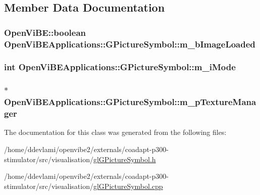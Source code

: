 \subsection{Member Data Documentation}
\hypertarget{classOpenViBEApplications_1_1GPictureSymbol_a2d1c4763b217b7b21de1a69ca0a2da35}{
\subsubsection[{m\_\-bImageLoaded}]{\setlength{\rightskip}{0pt plus 5cm}OpenViBE::boolean {\bf OpenViBEApplications::GPictureSymbol::m\_\-bImageLoaded}}}
\label{classOpenViBEApplications_1_1GPictureSymbol_a2d1c4763b217b7b21de1a69ca0a2da35}
\hypertarget{classOpenViBEApplications_1_1GPictureSymbol_a8a893eb95cd346f30b66bdd7379a80d4}{
\subsubsection[{m\_\-iMode}]{\setlength{\rightskip}{0pt plus 5cm}int {\bf OpenViBEApplications::GPictureSymbol::m\_\-iMode}}}
\label{classOpenViBEApplications_1_1GPictureSymbol_a8a893eb95cd346f30b66bdd7379a80d4}
\hypertarget{classOpenViBEApplications_1_1GPictureSymbol_a31525f4e7bbde19d7e455944184d12d0}{
\subsubsection[{m\_\-pTextureManager}]{$\ast$ {\bf OpenViBEApplications::GPictureSymbol::m\_\-pTextureManager}}}
\label{classOpenViBEApplications_1_1GPictureSymbol_a31525f4e7bbde19d7e455944184d12d0}


The documentation for this class was generated from the following files:\begin{DoxyCompactItemize}
\item 
/home/ddevlami/openvibe2/externals/coadapt-\/p300-\/stimulator/src/visualisation/\hyperlink{glGPictureSymbol_8h}{glGPictureSymbol.h}\item 
/home/ddevlami/openvibe2/externals/coadapt-\/p300-\/stimulator/src/visualisation/\hyperlink{glGPictureSymbol_8cpp}{glGPictureSymbol.cpp}\end{DoxyCompactItemize}
